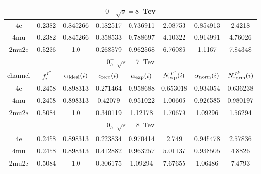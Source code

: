 \begin{table}[b]
\begin{tabular}{c c c c c c c c}
\multicolumn{8}{|c|}{$0^{-}$ $\sqrt{s}=8$~Tev} \\ \hline 

4e & 0.2382 & 0.845266 & 0.182517 & 0.736911
 & 2.08753%
 & 0.854913 & 2.4218 \\ \hline 
4mu & 0.2382 & 0.845266 & 0.358533 & 0.788697
 & 4.10322%
 & 0.914991 & 4.76026 \\ \hline 
2mu2e & 0.5236 & 1.0  & 0.268579 & 0.962568
 & 6.76086%
 & 1.1167 & 7.84348 \\ \hline \hline 

 \multicolumn{8}{|c|}{$0^{+}_{h}$ $\sqrt{s}=7$~Tev} \\ \hline 

channel & $f_{i}^{J^P}$ & $\alpha_{\rm ideal} (i)$ & $\epsilon_{\rm reco} (i)$ & $\alpha_{\rm exp} (i)$ & $N^{J^P}_{\rm exp} (i)$ & $\alpha_{\rm norm} (i)$ & $N^{J^P}_{\rm norm} (i)$\\ \hline 
4e & 0.2458 & 0.898313 & 0.271464 & 0.958688
 & 0.653018%
 & 0.934054 & 0.636238 \\ \hline 
4mu & 0.2458 & 0.898313 & 0.42079 & 0.951022
 & 1.00605%
 & 0.926585 & 0.980197 \\ \hline 
2mu2e & 0.5084 & 1.0  & 0.340119 & 1.12178
 & 1.70679%
 & 1.09296 & 1.66294 \\ \hline \hline 

 \multicolumn{8}{|c|}{$0^{+}_{h}$ $\sqrt{s}=8$~Tev} \\ \hline 

4e & 0.2458 & 0.898313 & 0.223834 & 0.970414
 & 2.749%
 & 0.945478 & 2.67836 \\ \hline 
4mu & 0.2458 & 0.898313 & 0.412882 & 0.963257
 & 5.01137%
 & 0.938505 & 4.8826 \\ \hline 
2mu2e & 0.5084 & 1.0  & 0.306175 & 1.09294
 & 7.67655%
 & 1.06486 & 7.4793 \\ \hline \hline 
\end{tabular}
\label{table:HZZ4lyieldcorr_spin0}
\end{table}

